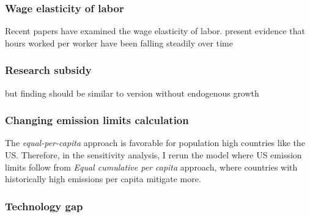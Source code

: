 \subsubsection{Wage elasticity of labor}

Recent papers have examined the wage elasticity of labor. \cite{Boppart2019LaborPerspectiveb} present evidence that hours worked per worker have been falling steadily over time 

\subsubsection{Research subsidy}
but finding should be similar to version without endogenous growth
\subsubsection{Changing emission limits calculation}
The \textit{equal-per-capita} approach is favorable for population high countries like the US. Therefore, in the sensitivity analysis, I rerun the model where US emission limits follow from \textit{Equal cumulative per capita} approach, where countries with historically  high emissions per capita mitigate more.

\subsubsection{Technology gap}